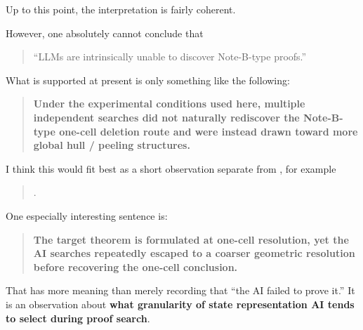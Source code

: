 \documentclass[11pt,a4paper]{article}
\begin{document}
Up to this point, the interpretation is fairly coherent.

However, one absolutely cannot conclude that

\begin{quote}
``LLMs are intrinsically unable to discover Note-B-type proofs.''
\end{quote}

What is supported at present is only something like the following:

\begin{quote}
\textbf{Under the experimental conditions used here, multiple independent searches did not naturally rediscover the Note-B-type one-cell deletion route and were instead drawn toward more global hull / peeling structures.}
\end{quote}

I think this would fit best as a short observation separate from , for example

\begin{quote}
.
\end{quote}

One especially interesting sentence is:

\begin{quote}
\textbf{The target theorem is formulated at one-cell resolution, yet the AI searches repeatedly escaped to a coarser geometric resolution before recovering the one-cell conclusion.}
\end{quote}

That has more meaning than merely recording that ``the AI failed to prove it.'' It is an observation about \textbf{what granularity of state representation AI tends to select during proof search}.
\end{document}
